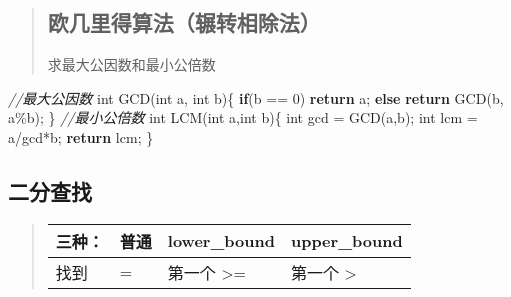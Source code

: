 \documentclass[
]{article}
\author{}
\date{}
\newenvironment{Shaded}{}{}
\newcommand{\CommentTok}[1]{\textcolor[rgb]{0.38,0.63,0.69}{\textit{#1}}}
\newcommand{\ControlFlowTok}[1]{\textcolor[rgb]{0.00,0.44,0.13}{\textbf{#1}}}
\newcommand{\DataTypeTok}[1]{\textcolor[rgb]{0.56,0.13,0.00}{#1}}
\newcommand{\DecValTok}[1]{\textcolor[rgb]{0.25,0.63,0.44}{#1}}
\newcommand{\NormalTok}[1]{#1}
\newcommand{\OperatorTok}[1]{\textcolor[rgb]{0.40,0.40,0.40}{#1}}
\begin{document}
\begin{quote}
\hypertarget{ux6b27ux51e0ux91ccux5f97ux7b97ux6cd5ux8f97ux8f6cux76f8ux9664ux6cd5uxff09}{%
\subsection{欧几里得算法（辗转相除法）}\label{ux6b27ux51e0ux91ccux5f97ux7b97ux6cd5ux8f97ux8f6cux76f8ux9664ux6cd5uxff09}}

求最大公因数和最小公倍数
\end{quote}

\begin{Shaded}
\begin{Highlighting}[]
\CommentTok{//最大公因数}
\DataTypeTok{int}\NormalTok{ GCD}\OperatorTok{(}\DataTypeTok{int}\NormalTok{ a}\OperatorTok{,} \DataTypeTok{int}\NormalTok{ b}\OperatorTok{)\{}
	\ControlFlowTok{if}\OperatorTok{(}\NormalTok{b }\OperatorTok{==} \DecValTok{0}\OperatorTok{)} \ControlFlowTok{return}\NormalTok{ a}\OperatorTok{;}
	\ControlFlowTok{else} \ControlFlowTok{return}\NormalTok{ GCD}\OperatorTok{(}\NormalTok{b}\OperatorTok{,}\NormalTok{ a}\OperatorTok{\%}\NormalTok{b}\OperatorTok{);}
\OperatorTok{\}}
\CommentTok{//最小公倍数}
\DataTypeTok{int}\NormalTok{ LCM}\OperatorTok{(}\DataTypeTok{int}\NormalTok{ a}\OperatorTok{,}\DataTypeTok{int}\NormalTok{ b}\OperatorTok{)\{}
    \DataTypeTok{int}\NormalTok{ gcd }\OperatorTok{=}\NormalTok{ GCD}\OperatorTok{(}\NormalTok{a}\OperatorTok{,}\NormalTok{b}\OperatorTok{);}
    \DataTypeTok{int}\NormalTok{ lcm }\OperatorTok{=}\NormalTok{ a}\OperatorTok{/}\NormalTok{gcd}\OperatorTok{*}\NormalTok{b}\OperatorTok{;}
    \ControlFlowTok{return}\NormalTok{ lcm}\OperatorTok{;}
\OperatorTok{\}}
\end{Highlighting}
\end{Shaded}

\hypertarget{ux4e8cux5206ux67e5ux627e}{%
\subsection{二分查找}\label{ux4e8cux5206ux67e5ux627e}}

\begin{quote}
\begin{longtable}[]{@{}llll@{}}
\toprule
三种： & 普通 & lower\_bound & upper\_bound \\
\midrule
\endhead
找到 & = & 第一个 \textgreater= & 第一个 \textgreater{} \\
\bottomrule
\end{longtable}
\end{quote}
\end{document}
